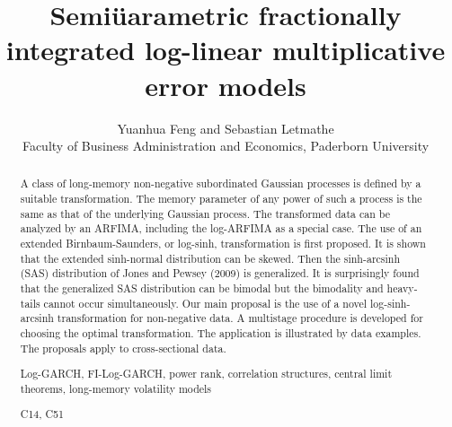 \documentclass[12pt]{article}
\begin{document}
\title{Semiüarametric fractionally integrated log-linear multiplicative error models}%
\author{Yuanhua Feng and Sebastian Letmathe\\ Faculty of Business Administration and Economics,
Paderborn University}
\maketitle









\begin{abstract}

\noindent 

 A class of long-memory non-negative subordinated Gaussian processes is defined by a suitable transformation. The memory parameter of any power of such a process is the same as that of the underlying Gaussian process. The transformed data can be analyzed by an ARFIMA, including the log-ARFIMA as a special case. The use of an extended Birnbaum-Saunders, or log-sinh, transformation is first proposed. It is shown that the extended sinh-normal distribution can be skewed. Then the sinh-arcsinh (SAS) distribution of Jones and Pewsey (2009) is generalized. It is surprisingly found that the generalized SAS distribution can be bimodal but the bimodality and heavy-tails cannot occur simultaneously. Our main proposal is the use of a novel log-sinh-arcsinh transformation for non-negative data. A multistage procedure is developed for choosing the optimal transformation. The application is illustrated by data examples. The proposals apply to cross-sectional data. 



\vspace{.3cm}

  Log-GARCH, FI-Log-GARCH, power rank, correlation structures, central limit theorems, long-memory volatility models



\vspace{.3cm}

 C14, C51
\end{abstract}
\end{document}
